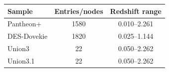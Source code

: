 \begin{tabular}{lcc}
\hline\hline
Sample & Entries/nodes & Redshift range \\
\hline
Pantheon+ & 1580 & 0.010--2.261 \\
DES-Dovekie & 1820 & 0.025--1.144 \\
Union3 & 22 & 0.050--2.262 \\
Union3.1 & 22 & 0.050--2.262 \\
\hline\hline
\end{tabular}

